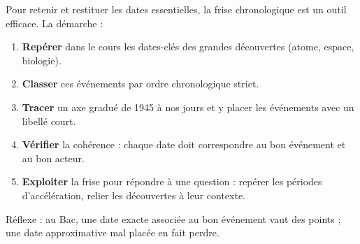 \documentclass[11pt]{article}
\begin{document}
\begin{methode}
Pour retenir et restituer les dates essentielles, la frise chronologique est un outil efficace. La démarche :
\begin{enumerate}
\item \textbf{Repérer} dans le cours les dates-clés des grandes découvertes (atome, espace, biologie).
\item \textbf{Classer} ces événements par ordre chronologique strict.
\item \textbf{Tracer} un axe gradué de 1945 à nos jours et y placer les événements avec un libellé court.
\item \textbf{Vérifier} la cohérence : chaque date doit correspondre au bon événement et au bon acteur.
\item \textbf{Exploiter} la frise pour répondre à une question : repérer les périodes d'accélération, relier les découvertes à leur contexte.
\end{enumerate}
Réflexe : au Bac, une date exacte associée au bon événement vaut des points ; une date approximative mal placée en fait perdre.
\end{methode}
\end{document}
